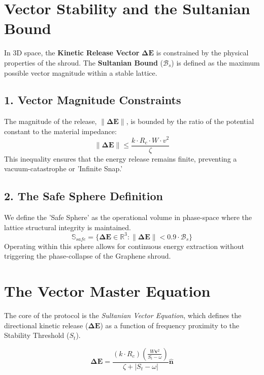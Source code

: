 \documentclass[11pt]{article}
\begin{document}
\section*{Vector Stability and the Sultanian Bound}

In 3D space, the \textbf{Kinetic Release Vector} $\mathbf{\Delta E}$ is constrained by the physical properties of the shroud. The \textbf{Sultanian Bound} ($\mathcal{B}_s$) is defined as the maximum possible vector magnitude within a stable lattice.

\subsection*{1. Vector Magnitude Constraints}
The magnitude of the release, $\|\mathbf{\Delta E}\|$, is bounded by the ratio of the potential constant to the material impedance:
\begin{equation}
    \|\mathbf{\Delta E}\| \leq \frac{k \cdot R_c \cdot W \cdot v^2}{\zeta}
\end{equation}
This inequality ensures that the energy release remains finite, preventing a vacuum-catastrophe or 'Infinite Snap.'

\subsection*{2. The Safe Sphere Definition}
We define the 'Safe Sphere' as the operational volume in phase-space where the lattice structural integrity is maintained.
\begin{equation}
    \mathbb{S}_{safe} = \{ \mathbf{\Delta E} \in \mathbb{R}^3 : \|\mathbf{\Delta E}\| < 0.9 \cdot \mathcal{B}_s \}
\end{equation}
Operating within this sphere allows for continuous energy extraction without triggering the phase-collapse of the Graphene shroud.



\section*{The Vector Master Equation}
The core of the protocol is the \textit{Sultanian Vector Equation}, which defines the directional kinetic release ($\mathbf{\Delta E}$) as a function of frequency proximity to the Stability Threshold ($S_t$).

\begin{equation}
    \mathbf{\Delta E} = \frac{(k \cdot R_c) \left( \frac{W \mathbf{v}^2}{S_t - \omega} \right)}{\zeta + |S_t - \omega|} \mathbf{\hat{n}}
\end{equation}
\end{document}
